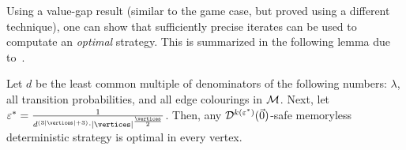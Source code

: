 
Using a value-gap result 
(similar to the game case, but proved using a different technique), one can 
show that sufficiently precise iterates can be used to computate an \emph{optimal} strategy. 
This is summarized in the following lemma due to~\cite{Tseng:1990}.

\begin{lemma}
\label{5-lem:disc-vi-optimal-strategy}
Let $d$ be the least common multiple of denominators of the following numbers: $\lambda$, all   
transition probabilities, and all edge colourings in $\mathcal{M}$. Next, let $\eps^* = 
\frac{1}{d^{(3|\vertices|+3)}\cdot |\vertices|^{\frac{\vertices}{2}}}$.
Then, any $\mathcal{D}^{k(\varepsilon^*)}(\vec{0})$-safe memoryless deterministic strategy 
is 
optimal in every 
vertex.
\end{lemma}
